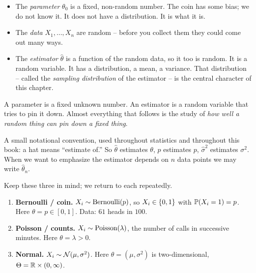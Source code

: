 \begin{itemize}
\item The \emph{parameter} $\theta_0$ is a fixed, non-random number. The coin
  has some bias; we do not know it. It does not have a
  distribution. It is what it is.
\item The \emph{data} $X_1,\dots,X_n$ are random -- before you collect them they
  could come out many ways.
\item The \emph{estimator} $\hat\theta$ is a function of the random data, so it
  too is random. It is a random variable. It has a distribution, a mean, a
  variance. That distribution -- called the \emph{sampling distribution} of the
  estimator -- is the central character of this chapter.
\end{itemize}

\begin{focusbox}
A parameter is a fixed unknown number. An estimator is a random variable that
tries to pin it down. Almost everything that follows is the study of \emph{how
well a random thing can pin down a fixed thing}.
\end{focusbox}

A small notational convention, used throughout statistics and throughout this
book: a hat means ``estimate of.'' So $\hat\theta$ estimates $\theta$,
$\hat p$ estimates $p$, $\hat\sigma^2$ estimates $\sigma^2$. When we want to
emphasize the estimator depends on $n$ data points we may write $\hat\theta_n$.

\begin{example}
\label{ch30:ex-three-models}
Keep these three in mind; we return to each repeatedly.
\begin{enumerate}
\item \textbf{Bernoulli / coin.} $X_i \sim \Bern(p)$, so $X_i \in \set{0,1}$
  with $\P(X_i=1)=p$. Here $\theta = p \in [0,1]$. Data: $61$ heads in $100$.
\item \textbf{Poisson / counts.} $X_i \sim \Pois(\lambda)$, the number of calls
  in successive minutes. Here $\theta = \lambda > 0$.
\item \textbf{Normal.} $X_i \sim \Normal(\mu,\sigma^2)$. Here
  $\theta = (\mu,\sigma^2)$ is two-dimensional, $\Theta = \R \times (0,\infty)$.
\end{enumerate}
\end{example}


